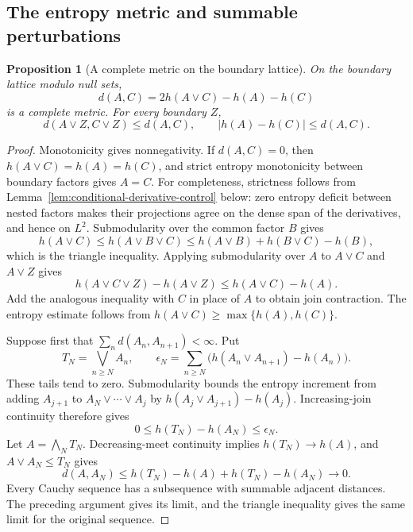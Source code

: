 \documentclass[11pt,letterpaper]{amsart}
\newtheorem{proposition}[theorem]{Proposition}
\theoremstyle{definition}
\theoremstyle{remark}
\numberwithin{equation}{section}
\begin{document}
\subsection{The entropy metric and summable perturbations}

\begin{proposition}[A complete metric on the boundary lattice]
\label{prop:boundary-entropy-metric}
On the boundary lattice modulo null sets,
\[
 d(A,C)=2h(A\vee C)-h(A)-h(C)
\]
is a complete metric. For every boundary $Z$,
\[
 d(A\vee Z,C\vee Z)\le d(A,C),
 \qquad |h(A)-h(C)|\le d(A,C).
\]
\end{proposition}
\begin{proof}
Monotonicity gives nonnegativity. If $d(A,C)=0$, then
$h(A\vee C)=h(A)=h(C)$, and strict entropy monotonicity between
boundary factors gives $A=C$. For completeness, strictness follows
from Lemma~\ref{lem:conditional-derivative-control} below: zero entropy
deficit between nested factors makes their projections agree on the
dense span of the derivatives, and hence on $L^2$. Submodularity over the common factor
$B$ gives
\[
 h(A\vee C)\le h(A\vee B\vee C)
 \le h(A\vee B)+h(B\vee C)-h(B),
\]
which is the triangle inequality. Applying submodularity over $A$
to $A\vee C$ and $A\vee Z$ gives
\[
 h(A\vee C\vee Z)-h(A\vee Z)
 \le h(A\vee C)-h(A).
\]
Add the analogous inequality with $C$ in place of $A$ to obtain
join contraction. The entropy estimate follows from
$h(A\vee C)\ge\max\{h(A),h(C)\}$.

Suppose first that $\sum_n d(A_n,A_{n+1})<\infty$. Put
\[
 T_N=\bigvee_{n\ge N}A_n,
 \qquad
 \epsilon_N=\sum_{n\ge N}
 \bigl(h(A_n\vee A_{n+1})-h(A_n)\bigr).
\]
These tails tend to zero. Submodularity bounds the entropy increment
from adding $A_{j+1}$ to $A_N\vee\cdots\vee A_j$ by
$h(A_j\vee A_{j+1})-h(A_j)$. Increasing-join continuity therefore gives
\begin{equation}\label{eq:tail-join-bound}
 0\le h(T_N)-h(A_N)\le\epsilon_N.
\end{equation}
Let $A=\bigwedge_N T_N$. Decreasing-meet continuity implies
$h(T_N)\to h(A)$, and $A\vee A_N\le T_N$ gives
\[
 d(A,A_N)
 \le h(T_N)-h(A)+h(T_N)-h(A_N)\longrightarrow0.
\]
Every Cauchy sequence has a subsequence with summable adjacent
distances. The preceding argument gives its limit, and the triangle
inequality gives the same limit for the original sequence.
\end{proof}
\end{document}
